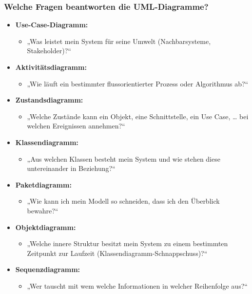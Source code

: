 \documentclass[11pt, a4paper]{article}
\begin{document}
\newpage

\raggedright \subsubsection*{Welche Fragen beantworten die UML-Diagramme?}
\vspace{3em}
\begin{itemize}
    \item \textbf{Use-Case-Diagramm:}
    \begin{itemize}
        \item „Was leistet mein System für seine Umwelt (Nachbarsysteme, Stakeholder)?“
    \end{itemize}
    \item \textbf{Aktivitätsdiagramm:}
    \begin{itemize}
        \item „Wie läuft ein bestimmter flussorientierter Prozess oder Algorithmus ab?“
    \end{itemize}
    \item \textbf{Zustandsdiagramm:}
    \begin{itemize}
        \item „Welche Zustände kann ein Objekt, eine Schnittstelle, ein Use Case, … bei welchen Ereignissen annehmen?“
    \end{itemize}
    \item \textbf{Klassendiagramm:}
    \begin{itemize}
        \item „Aus welchen Klassen besteht mein System und wie stehen diese untereinander in Beziehung?“
    \end{itemize}
    \item \textbf{Paketdiagramm:}
    \begin{itemize}
        \item „Wie kann ich mein Modell so schneiden, dass ich den Überblick bewahre?“
    \end{itemize}
    \item \textbf{Objektdiagramm:}
    \begin{itemize}
        \item „Welche innere Struktur besitzt mein System zu einem bestimmten Zeitpunkt zur Laufzeit (Klassendiagramm-Schnappschuss)?“
    \end{itemize}
    \item \textbf{Sequenzdiagramm:}
    \begin{itemize}
        \item „Wer tauscht mit wem welche Informationen in welcher Reihenfolge aus?“

\end{itemize}
\end{itemize}
\end{document}
